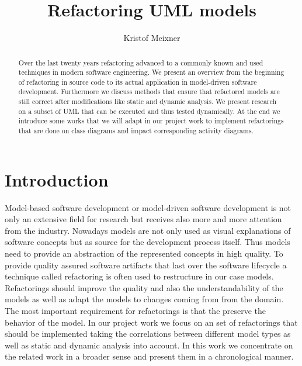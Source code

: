 \documentclass{llncs}
\begin{document}
\pagestyle{plain}

\title{Refactoring UML models}
\author{Kristof Meixner}

\maketitle

\begin{abstract} Over the last twenty years refactoring advanced to a commonly known and used techniques in modern
software engineering. We present an overview from the beginning of refactoring in source code to its actual application
in model-driven software development. Furthermore we discuss methods that ensure that refactored models are still
correct after modifications like static and dynamic analysis. We present research on a subset of UML that can be
executed and thus tested dynamically. At the end we introduce some works that we will adapt in our project work to
implement refactorings that are done on class diagrams and impact corresponding activity diagrams.
\end{abstract}

\tableofcontents
\newpage


\section{Introduction}
\label{sec:intro}

Model-based software development or model-driven software development is not only an extensive field for research but
receives also more and more attention from the industry. Nowadays models are not only used as visual explanations of
software concepts but as source for the development process itself. Thus models need to provide an abstraction of the
represented concepts in high quality. To provide quality assured software artifacts that last over the software
lifecycle a technique called refactoring is often used to restructure in our case models. Refactorings should improve
the quality and also the understandability of the models as well as adapt the models to changes coming from from the
domain. The most important requirement for refactorings is that the preserve the behavior of the model. In our project
work we focus on an set of refactorings that should be implemented taking the correlations between different model types
as well as static and dynamic analysis into account. In this work we concentrate on the related work in a broader sense
and present them in a chronological manner.
\end{document}
